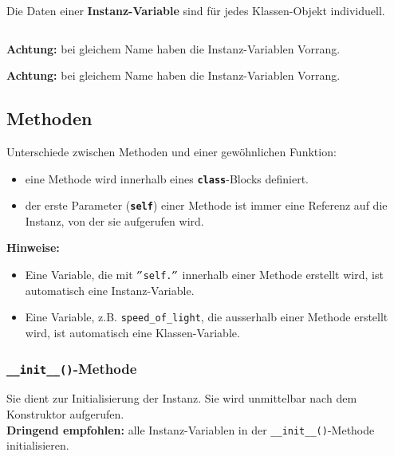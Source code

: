 \begin{minipage}[t]{0.49\textwidth}
	Die Daten einer \textbf{Instanz-Variable} sind für jedes Klassen-Objekt individuell.
	
\end{minipage}
\begin{minipage}[t]{0.02\textwidth} $\quad$ \end{minipage}
\begin{minipage}[t]{0.49\textwidth}
	\textbf{Achtung:} bei gleichem Name haben die Instanz-Variablen Vorrang.
	
\end{minipage}


\textbf{Achtung:} bei gleichem Name haben die Instanz-Variablen Vorrang.


\subsection{Methoden}

Unterschiede zwischen Methoden und einer gewöhnlichen Funktion:
\begin{itemize}
	\item eine Methode wird innerhalb eines \textbf{\texttt{class}}-Blocks definiert.
	\item der erste Parameter (\textbf{\texttt{self}}) einer Methode ist immer eine Referenz auf die Instanz, von der sie aufgerufen wird.
\end{itemize}
\textbf{Hinweise:}
\begin{itemize}
	\item Eine Variable, die mit $"$\texttt{self.}$"$ innerhalb einer Methode erstellt wird, ist automatisch eine Instanz-Variable.
	\item Eine Variable, z.B. \texttt{speed\_of\_light}, die ausserhalb einer Methode erstellt wird, ist automatisch eine Klassen-Variable.
\end{itemize}


\begin{minipage}[t]{0.49\textwidth}
	\subsubsection{\texttt{\_\_init\_\_()}-Methode}
	Sie dient zur Initialisierung der Instanz. Sie wird unmittelbar nach dem Konstruktor aufgerufen.\\
	\textbf{Dringend empfohlen:} alle Instanz-Variablen in der \texttt{\_\_init\_\_()}-Methode initialisieren.
\end{minipage}
\begin{minipage}[t]{0.02\textwidth} $\quad$ \end{minipage}
\begin{minipage}[t]{0.49\textwidth}
	
\end{minipage}\\[12pt]

